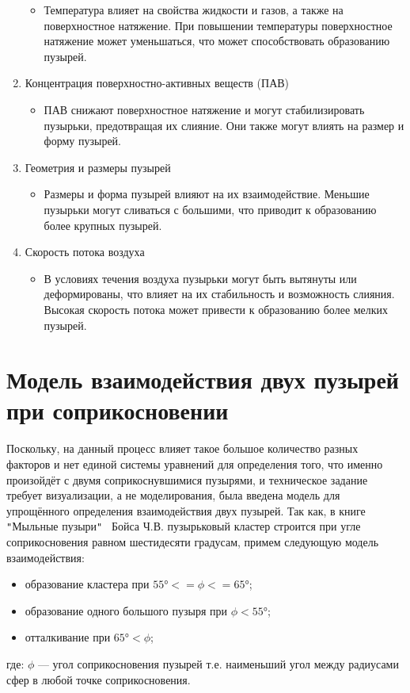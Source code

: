 \begin{enumerate}[label={\arabic*)}]
	\begin{itemize}	
		\item Температура влияет на свойства жидкости и газов, а также на поверхностное натяжение. При повышении температуры поверхностное натяжение может уменьшаться, что может способствовать образованию пузырей.
	\end{itemize}
	\item Концентрация поверхностно-активных веществ (ПАВ)
	\begin{itemize}	
		\item ПАВ снижают поверхностное натяжение и могут стабилизировать пузырьки, предотвращая их слияние. Они также могут влиять на размер и форму пузырей.
	\end{itemize}
	\item Геометрия и размеры пузырей
	\begin{itemize}	
		\item Размеры и форма пузырей влияют на их взаимодействие. Меньшие пузырьки могут сливаться с большими, что приводит к образованию более крупных пузырей.
	\end{itemize}	
	\item Скорость потока воздуха
	\begin{itemize}	
		\item В условиях течения воздуха пузырьки могут быть вытянуты или деформированы, что влияет на их стабильность и возможность слияния. Высокая скорость потока может привести к образованию более мелких пузырей.
	\end{itemize}	
\end{enumerate}

\section{Модель взаимодействия двух пузырей при соприкосновении}
Поскольку, на данный процесс влияет такое большое количество разных факторов и нет единой системы уравнений для определения того, что именно произойдёт с двумя соприкоснувшимися пузырями, и техническое задание требует визуализации, а не моделирования, была введена модель для упрощённого определения взаимодействия двух пузырей. Так как, в книге \verb|"|Мыльные пузыри\verb|"|~\cite{boys} Бойса Ч.В. пузырьковый кластер строится при угле соприкосновения равном шестидесяти градусам, примем следующую модель взаимодействия:
\begin{itemize}	
	\item образование кластера при $ 55° <= \phi <= 65°$;
	\item образование одного большого пузыря при $\phi < 55°$;
	\item отталкивание при $ 65° < \phi$;
\end{itemize}
где: $\phi$ --- угол соприкосновения пузырей т.е. наименьший угол между радиусами сфер в любой точке соприкосновения.
	
